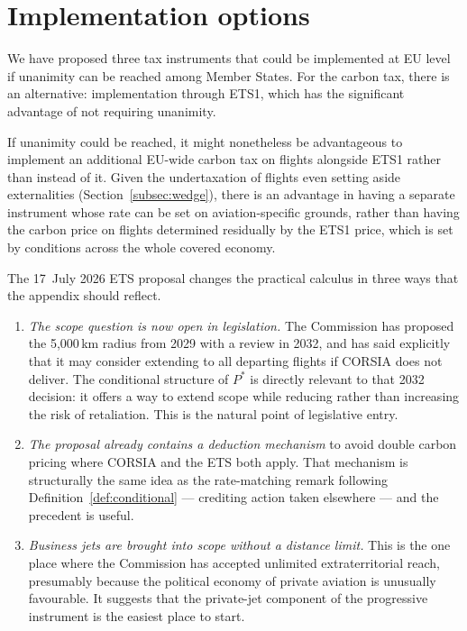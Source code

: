 \documentclass[11pt]{article}
\begin{document}
\section{Implementation options}
\label{sec:implementation}

We have proposed three tax instruments that could be implemented at EU level if
unanimity can be reached among Member States. For the carbon tax, there is an
alternative: implementation through ETS1, which has the significant advantage of
not requiring unanimity.

If unanimity could be reached, it might nonetheless be advantageous to implement
an additional EU-wide carbon tax on flights alongside ETS1 rather than instead of
it. Given the undertaxation of flights even setting aside externalities
(Section~\ref{subsec:wedge}), there is an advantage in having a separate
instrument whose rate can be set on aviation-specific grounds, rather than having
the carbon price on flights determined residually by the ETS1 price, which is set
by conditions across the whole covered economy.

The 17~July 2026 ETS proposal changes the practical calculus in three ways that
the appendix should reflect.

\begin{enumerate}
  \item \emph{The scope question is now open in legislation.} The Commission has
  proposed the 5{,}000\,km radius from 2029 with a review in 2032, and has said
  explicitly that it may consider extending to all departing flights if CORSIA
  does not deliver. The conditional structure of $P^{*}$ is directly relevant to
  that 2032 decision: it offers a way to extend scope while reducing rather than
  increasing the risk of retaliation. This is the natural point of legislative
  entry.
  \item \emph{The proposal already contains a deduction mechanism} to avoid
  double carbon pricing where CORSIA and the ETS both apply. That mechanism is
  structurally the same idea as the rate-matching remark following
  Definition~\ref{def:conditional} --- crediting action taken elsewhere --- and
  the precedent is useful.
  \item \emph{Business jets are brought into scope without a distance limit.}
  This is the one place where the Commission has accepted unlimited
  extraterritorial reach, presumably because the political economy of private
  aviation is unusually favourable. It suggests that the private-jet component of
  the progressive instrument is the easiest place to start.
\end{enumerate}
\end{document}
